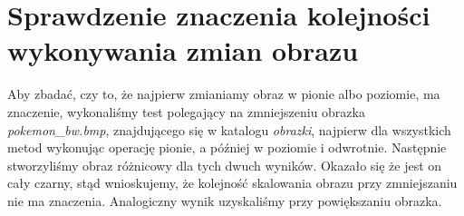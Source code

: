 \section{Sprawdzenie znaczenia kolejności wykonywania zmian obrazu}
Aby zbadać, czy to, że najpierw zmianiamy obraz w pionie albo poziomie, ma znaczenie,
wykonaliśmy test polegający na zmniejszeniu obrazka \textit{pokemon\_bw.bmp},
znajdującego się w katalogu \textit{obrazki}, najpierw dla wszystkich metod wykonując operację pionie,
a później w poziomie i odwrotnie. Następnie stworzyliśmy obraz różnicowy dla
tych dwuch wyników. Okazało się że jest on cały czarny, stąd wnioskujemy, że
kolejność skalowania obrazu przy zmniejszaniu nie ma znaczenia. Analogiczny wynik
uzyskaliśmy przy powiększaniu obrazka.
